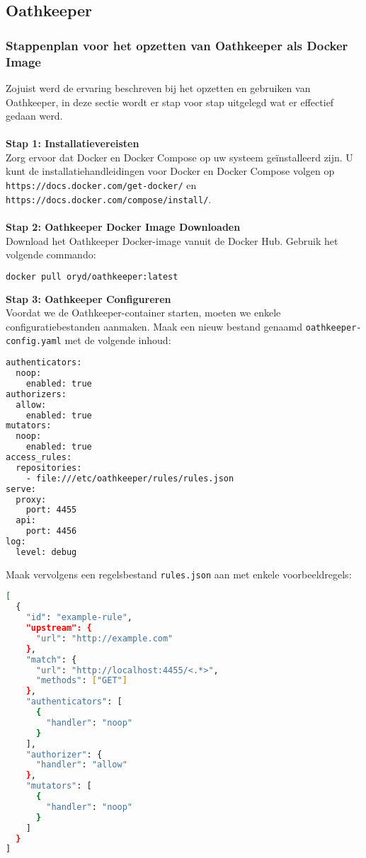 \subsection{Oathkeeper}%
\label{subsec:oathkeeper}
\subsubsection{Stappenplan voor het opzetten van Oathkeeper als Docker Image}%
\label{subsubsec:oathkeeper-setup}
Zojuist werd de ervaring beschreven bij het opzetten en gebruiken van Oathkeeper, in deze sectie wordt er stap voor stap uitgelegd wat er effectief gedaan werd.\\\\
\textbf{Stap 1: Installatievereisten}\\
Zorg ervoor dat Docker en Docker Compose op uw systeem geïnstalleerd zijn. U kunt de installatiehandleidingen voor Docker en Docker Compose volgen op\\ \texttt{https://docs.docker.com/get-docker/} en \texttt{https://docs.docker.com/compose/install/}.\\\\
\textbf{Stap 2: Oathkeeper Docker Image Downloaden}\\
Download het Oathkeeper Docker-image vanuit de Docker Hub. Gebruik het volgende commando:
\begin{lstlisting}[language=bash]
docker pull oryd/oathkeeper:latest
\end{lstlisting}
\textbf{Stap 3: Oathkeeper Configureren}\\
Voordat we de Oathkeeper-container starten, moeten we enkele configuratiebestanden aanmaken. Maak een nieuw bestand genaamd \texttt{oathkeeper-config.yaml} met de volgende inhoud:
\begin{lstlisting}[language=bash]
authenticators:
  noop:
    enabled: true
authorizers:
  allow:
    enabled: true
mutators:
  noop:
    enabled: true
access_rules:
  repositories:
    - file:///etc/oathkeeper/rules/rules.json
serve:
  proxy:
    port: 4455
  api:
    port: 4456
log:
  level: debug
\end{lstlisting}
Maak vervolgens een regelsbestand \texttt{rules.json} aan met enkele voorbeeldregels:
\begin{lstlisting}[language=bash]
[
  {
    "id": "example-rule",
    "upstream": {
      "url": "http://example.com"
    },
    "match": {
      "url": "http://localhost:4455/<.*>",
      "methods": ["GET"]
    },
    "authenticators": [
      {
        "handler": "noop"
      }
    ],
    "authorizer": {
      "handler": "allow"
    },
    "mutators": [
      {
        "handler": "noop"
      }
    ]
  }
]
\end{lstlisting}

